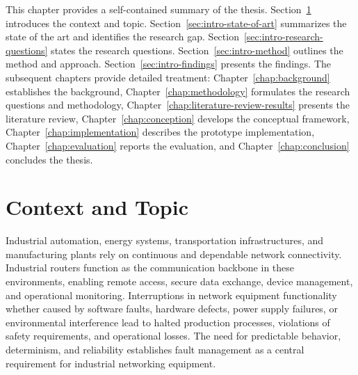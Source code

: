 This chapter provides a self-contained summary of the thesis. Section~\ref{sec:context-and-topic} introduces the context and topic. Section~\ref{sec:intro-state-of-art} summarizes the state of the art and identifies the research gap. Section~\ref{sec:intro-research-questions} states the research questions. Section~\ref{sec:intro-method} outlines the method and approach. Section~\ref{sec:intro-findings} presents the findings. The subsequent chapters provide detailed treatment: Chapter~\ref{chap:background} establishes the background, Chapter~\ref{chap:methodology} formulates the research questions and methodology, Chapter~\ref{chap:literature-review-results} presents the literature review, Chapter~\ref{chap:conception} develops the conceptual framework, Chapter~\ref{chap:implementation} describes the prototype implementation, Chapter~\ref{chap:evaluation} reports the evaluation, and Chapter~\ref{chap:conclusion} concludes the thesis.

\section{Context and Topic}\label{sec:context-and-topic}

Industrial automation, energy systems, transportation infrastructures, and manufacturing plants rely on continuous and dependable network connectivity. Industrial routers function as the communication backbone in these environments, enabling remote access, secure data exchange, device management, and operational monitoring. Interruptions in network equipment functionality whether caused by software faults, hardware defects, power supply failures, or environmental interference lead to halted production processes, violations of safety requirements, and operational losses. The need for predictable behavior, determinism, and reliability establishes fault management as a central requirement for industrial networking equipment.

